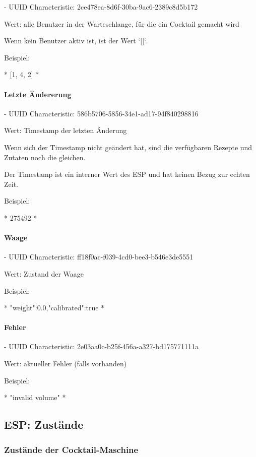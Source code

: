 {	- UUID Characteristic: 2ce478ea-8d6f-30ba-9ac6-2389c8d5b172
	
	Wert: alle Benutzer in der Warteschlange, für die ein Cocktail gemacht wird
	
	Wenn kein Benutzer aktiv ist, ist der Wert `[]`.
	
	Beispiel:
	
	*
	[1, 4, 2]
	*
	
	\paragraph{ Letzte Ändererung}
	
	- UUID Characteristic: 586b5706-5856-34e1-ad17-94f840298816
	
	Wert: Timestamp der letzten Änderung
	
	Wenn sich der Timestamp nicht geändert hat, sind die verfügbaren Rezepte und Zutaten noch die gleichen.
	
	Der Timestamp ist ein interner Wert des ESP und hat keinen Bezug zur echten Zeit.
	
	Beispiel:
	
	*
	275492
	*
	
	\paragraph{ Waage}
	
	- UUID Characteristic: ff18f0ac-f039-4cd0-bee3-b546e3de5551
	
	Wert: Zustand der Waage
	
	Beispiel:
	
	*
	{"weight":0.0,"calibrated":true}
	*
	
	\paragraph{ Fehler}
	
	- UUID Characteristic: 2e03aa0c-b25f-456a-a327-bd175771111a
	
	Wert: aktueller Fehler (falls vorhanden)
	
	Beispiel:
	
	*
	"invalid volume"
	*
	
	\subsection{ESP: Zustände}
	\subsubsection{ Zustände der Cocktail-Maschine}
	
}
